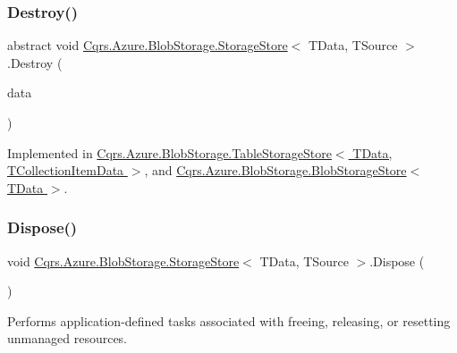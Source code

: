 \subsubsection{\texorpdfstring{Destroy()}{Destroy()}}
{\footnotesize\ttfamily abstract void \hyperlink{classCqrs_1_1Azure_1_1BlobStorage_1_1StorageStore}{Cqrs.\+Azure.\+Blob\+Storage.\+Storage\+Store}$<$ T\+Data, T\+Source $>$.Destroy (\begin{DoxyParamCaption}\item[{T\+Data}]{data }\end{DoxyParamCaption})\hspace{0.3cm}{\ttfamily [pure virtual]}}



Implemented in \hyperlink{classCqrs_1_1Azure_1_1BlobStorage_1_1TableStorageStore_a1ad02e710a3fe1d794d99db332c351dc_a1ad02e710a3fe1d794d99db332c351dc}{Cqrs.\+Azure.\+Blob\+Storage.\+Table\+Storage\+Store$<$ T\+Data, T\+Collection\+Item\+Data $>$}, and \hyperlink{classCqrs_1_1Azure_1_1BlobStorage_1_1BlobStorageStore_a7e4870567b393327563d131cb25151e0_a7e4870567b393327563d131cb25151e0}{Cqrs.\+Azure.\+Blob\+Storage.\+Blob\+Storage\+Store$<$ T\+Data $>$}.

\mbox{\label{classCqrs_1_1Azure_1_1BlobStorage_1_1StorageStore_a3fddffcffd2bd3c79212bb6ef2cdc422_a3fddffcffd2bd3c79212bb6ef2cdc422}} 
\subsubsection{\texorpdfstring{Dispose()}{Dispose()}}
{\footnotesize\ttfamily void \hyperlink{classCqrs_1_1Azure_1_1BlobStorage_1_1StorageStore}{Cqrs.\+Azure.\+Blob\+Storage.\+Storage\+Store}$<$ T\+Data, T\+Source $>$.Dispose (\begin{DoxyParamCaption}{ }\end{DoxyParamCaption})}



Performs application-\/defined tasks associated with freeing, releasing, or resetting unmanaged resources. 

\mbox{\label{classCqrs_1_1Azure_1_1BlobStorage_1_1StorageStore_a2eb689ea51d586309b79d6cbac05b616_a2eb689ea51d586309b79d6cbac05b616}} 
